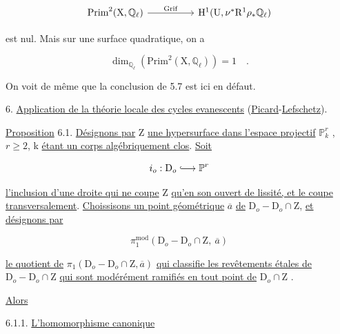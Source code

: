 \begin{equation*}
\begin{tikzcd}[column sep=huge]
\mathrm{Prim}^2(\mathrm{X},\mathbb{Q}_\ell) \arrow[r, "\mathrm{Grif}"] & \mathrm{H}^1(\mathrm{U},\nu^*\mathrm{R}^1\rho_*\mathbb{Q}_\ell)
\end{tikzcd}
\end{equation*}

est nul. Mais sur une surface quadratique, on a

\begin{equation*}
\dim_{\mathbb{Q}_\ell} \left( \mathrm{Prim}^2(\mathrm{X},\mathbb{Q}_\ell) \right) = 1 \quad .
\end{equation*}

On voit de même que la conclusion de 5.7 est ici en défaut.

6. \underline{Application de la théorie locale des cycles evanescents} (\underline{Picard}-\underline{Lefschetz}).

\underline{Proposition} 6.1. \underline{Désignons par} Z \underline{une hypersurface dans l'espace projectif} $\mathbb{P}^r_k$ , $r \geq 2$, k \underline{étant un corps algébriquement clos}. \underline{Soit}

\begin{equation*}
i_o : \mathrm{D}_o \lhook\joinrel\longrightarrow \mathbb{P}^r
\end{equation*}

\underline{l'inclusion d'une droite qui ne coupe} Z \underline{qu'en son ouvert de lissité, et le coupe transversalement}. \underline{Choissisons un point géométrique} $\overline{a}$ \underline{de} $\mathrm{D}_o - \mathrm{D}_o \cap \mathrm{Z}$, \underline{et désignons par}

\begin{equation*}
\pi_1^{\mathrm{mod}}(\mathrm{D}_o - \mathrm{D}_o \cap \mathrm{Z}, \ \overline{a})
\end{equation*}

\underline{le quotient de} $\pi_1(\mathrm{D}_o - \mathrm{D}_o \cap \mathrm{Z}, \overline{a})$ \underline{qui classifie les revêtements étales de} $\mathrm{D}_o - \mathrm{D}_o \cap \mathrm{Z}$ \underline{qui sont modérément ramifiés en tout point de} $\mathrm{D}_o \cap \mathrm{Z}$ .

\underline{Alors}



%
%
6.1.1. \underline{L'homomorphisme canonique}

